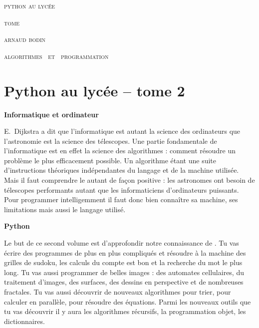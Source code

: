 
\pagestyle{empty}\thispagestyle{empty}
\vspace*{\fill}
\vspace*{5ex}
\begin{center}
	\fontsize{40}{40}\selectfont
	\textsc{python au lycée}
	
	\vspace*{-0.5ex}
	\textsc{\fontsize{24}{24}\selectfont tome \fontsize{22}{22}}
	
	\vspace*{2ex}
	
	\Large
	\textsc{arnaud bodin}

\end{center}
\vfill
\begin{center}
	\Large
	\textsc{algorithmes \  et \  programmation}
\end{center}
\begin{center}
\end{center}

\clearemptydoublepage

\thispagestyle{empty}

\vspace*{\fill}
\section*{Python au lycée -- tome 2}



{\large\textbf{Informatique et ordinateur}}

E.~Dijkstra a dit que \og{}l'informatique est autant la science des ordinateurs que l'astronomie est la science des télescopes\fg{}. 
Une partie fondamentale de l'informatique est en effet la science des algorithmes :
comment résoudre un problème le plus efficacement possible.
Un algorithme étant une suite d'instructions théoriques indépendantes du langage et de la machine utilisée.
Mais il faut comprendre le \og{}autant\fg{} de façon positive : les astronomes ont besoin de télescopes performants  autant que les informaticiens d'ordinateurs puissants. Pour programmer intelligemment il faut donc bien connaître sa machine, ses limitations mais aussi le langage utilisé.

 
\bigskip

{\large\textbf{Python}}

Le but de ce second volume est d'approfondir notre connaissance de \Python{}. Tu vas écrire des programmes de plus en plus compliqués et résoudre à la machine des grilles de sudoku, les calculs du \og{}compte est bon\fg{} et la recherche du \og{}mot le plus long\fg{}. Tu vas aussi programmer de belles images : des automates cellulaires, du traitement d'images, des surfaces, des dessins en perspective et de nombreuses fractales.
Tu vas aussi découvrir de nouveaux algorithmes pour trier, pour calculer en parallèle, pour résoudre des équations. Parmi les nouveaux outils que tu vas découvrir il y aura les algorithmes récursifs, la programmation objet, les dictionnaires.

